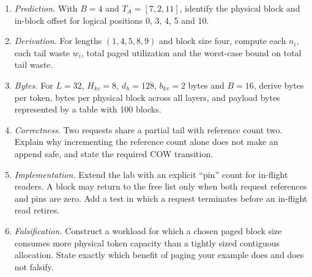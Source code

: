 \begin{enumerate}
\item \emph{Prediction.} With $B=4$ and $T_A=[7,2,11]$, identify the physical
block and in-block offset for logical positions 0, 3, 4, 5 and 10.

\item \emph{Derivation.} For lengths $(1,4,5,8,9)$ and block size four,
compute each $n_i$, each tail waste $w_i$, total paged utilization and the
worst-case bound on total tail waste.

\item \emph{Bytes.} For $L=32$, $H_{kv}=8$, $d_h=128$, $b_{kv}=2$ bytes and
$B=16$, derive bytes per token, bytes per physical block across all layers,
and payload bytes represented by a table with 100 blocks.

\item \emph{Correctness.} Two requests share a partial tail with reference
count two. Explain why incrementing the reference count alone does not make an
append safe, and state the required COW transition.

\item \emph{Implementation.} Extend the lab with an explicit ``pin'' count for
in-flight readers. A block may return to the free list only when both request
references and pins are zero. Add a test in which a request terminates before
an in-flight read retires.

\item \emph{Falsification.} Construct a workload for which a chosen paged
block size consumes more physical token capacity than a tightly sized
contiguous allocation. State exactly which benefit of paging your example
does and does not falsify.
\end{enumerate}


